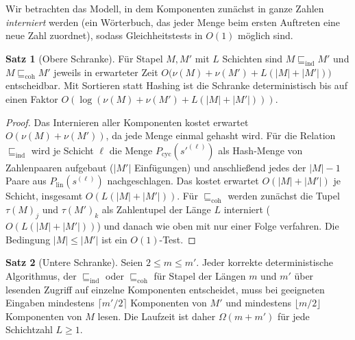 \documentclass[a4paper,12pt, twoside]{report}
\theoremstyle{definition}
\newtheorem{satz}{Satz}
\begin{document}
Wir betrachten das Modell, in dem Komponenten zunächst in ganze Zahlen \emph{interniert} werden (ein Wörterbuch, das jeder Menge beim ersten Auftreten eine neue Zahl zuordnet), sodass Gleichheitstests in $O(1)$ möglich sind.

\begin{satz}[Obere Schranke]
	\label{satz:univ_vergleich}
	Für Stapel $M,M'$ mit $L$ Schichten sind $M\sqsubseteq_{\mathrm{ind}}M'$ und $M\sqsubseteq_{\mathrm{coh}}M'$ jeweils in erwarteter Zeit $O\big(\nu(M)+\nu(M')+L(|M|+|M'|)\big)$ entscheidbar. Mit Sortieren statt Hashing ist die Schranke deterministisch bis auf einen Faktor $O(\log(\nu(M)+\nu(M')+L(|M|+|M'|)))$.
\end{satz}

\begin{proof}
	Das Internieren aller Komponenten kostet erwartet $O(\nu(M)+\nu(M'))$, da jede Menge einmal gehasht wird. Für die Relation $\sqsubseteq_{\mathrm{ind}}$ wird je Schicht $\ell$ die Menge $P_{\mathrm{cyc}}(s'^{(\ell)})$ als Hash-Menge von Zahlenpaaren aufgebaut ($|M'|$ Einfügungen) und anschließend jedes der $|M|-1$ Paare aus $P_{\mathrm{lin}}(s^{(\ell)})$ nachgeschlagen. Das kostet erwartet $O(|M|+|M'|)$ je Schicht, insgesamt $O(L(|M|+|M'|))$. Für $\sqsubseteq_{\mathrm{coh}}$ werden zunächst die Tupel $\tau(M)_j$ und $\tau(M')_k$ als Zahlentupel der Länge $L$ interniert ($O(L(|M|+|M'|))$) und danach wie oben mit nur einer Folge verfahren. Die Bedingung $|M|\le|M'|$ ist ein $O(1)$-Test.
\end{proof}

\begin{satz}[Untere Schranke]
	\label{satz:univ_untere}
	Seien $2\le m\le m'$. Jeder korrekte deterministische Algorithmus, der $\sqsubseteq_{\mathrm{ind}}$ oder $\sqsubseteq_{\mathrm{coh}}$ für Stapel der Längen $m$ und $m'$ über lesenden Zugriff auf einzelne Komponenten entscheidet, muss bei geeigneten Eingaben mindestens $\lceil m'/2\rceil$ Komponenten von $M'$ und mindestens $\lfloor m/2\rfloor$ Komponenten von $M$ lesen. Die Laufzeit ist daher $\Omega(m+m')$ für jede Schichtzahl $L\ge1$.
\end{satz}
\end{document}

